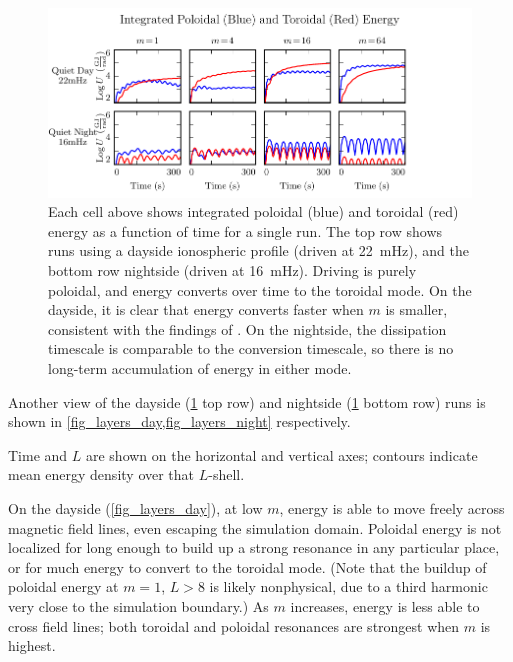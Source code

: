 \documentclass[draft,linenumbers]{agujournal}
\begin{document}
\begin{figure}
    \begin{center}
    \includegraphics[width=\textwidth]{figures/fig_energy.pdf}
    \caption{
        Each cell above shows integrated poloidal (blue) and toroidal (red) energy as a function of time for a single run. The top row shows runs using a dayside ionospheric profile (driven at \SI{22}{\mHz}), and the bottom row nightside (driven at \SI{16}{\mHz}). Driving is purely poloidal, and energy converts over time to the toroidal mode. On the dayside, it is clear that energy converts faster when $m$ is smaller, consistent with the findings of \citet{mann_1995}. On the nightside, the dissipation timescale is comparable to the conversion timescale, so there is no long-term accumulation of energy in either mode.
    }
    \label{fig_energy}
    \end{center}
\end{figure}

Another view of the dayside (\cref{fig_energy} top row) and nightside (\cref{fig_energy} bottom row) runs is shown in \cref{fig_layers_day,fig_layers_night} respectively.

Time and $L$ are shown on the horizontal and vertical axes; contours indicate mean energy density over that $L$-shell.

On the dayside (\cref{fig_layers_day}), at low $m$, energy is able to move freely across magnetic field lines, even escaping the simulation domain. Poloidal energy is not localized for long enough to build up a strong resonance in any particular place, or for much energy to convert to the toroidal mode. (Note that the buildup of poloidal energy at $m = 1$, $L > 8$ is likely nonphysical, due to a third harmonic very close to the simulation boundary.) As $m$ increases, energy is less able to cross field lines; both toroidal and poloidal resonances are strongest when $m$ is highest.
\end{document}
